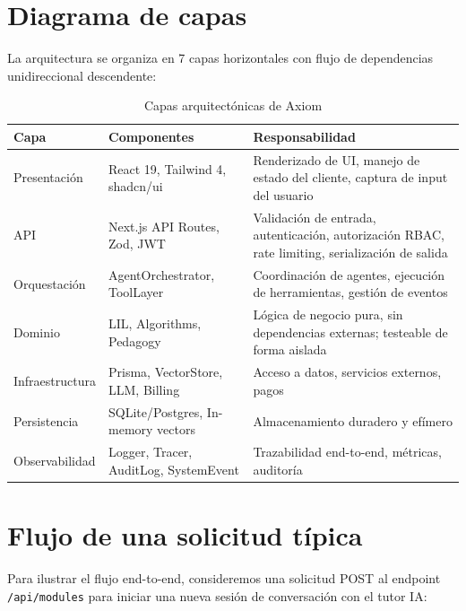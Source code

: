 \documentclass[10pt,a4paper,oneside]{report}
\begin{document}
\section{Diagrama de capas}
La arquitectura se organiza en 7 capas horizontales con flujo de dependencias unidireccional descendente:

\begin{table}[H]
\centering
\begin{tabular}{p{2.8cm}p{3.5cm}p{7.5cm}}
\toprule
\textbf{Capa} & \textbf{Componentes} & \textbf{Responsabilidad} \\
\midrule
Presentación & React 19, Tailwind 4, shadcn/ui & Renderizado de UI, manejo de estado del cliente, captura de input del usuario \\
API & Next.js API Routes, Zod, JWT & Validación de entrada, autenticación, autorización RBAC, rate limiting, serialización de salida \\
Orquestación & AgentOrchestrator, ToolLayer & Coordinación de agentes, ejecución de herramientas, gestión de eventos \\
Dominio & LIL, Algorithms, Pedagogy & Lógica de negocio pura, sin dependencias externas; testeable de forma aislada \\
Infraestructura & Prisma, VectorStore, LLM, Billing & Acceso a datos, servicios externos, pagos \\
Persistencia & SQLite/Postgres, In-memory vectors & Almacenamiento duradero y efímero \\
Observabilidad & Logger, Tracer, AuditLog, SystemEvent & Trazabilidad end-to-end, métricas, auditoría \\
\bottomrule
\end{tabular}
\caption{Capas arquitectónicas de Axiom}
\end{table}

\section{Flujo de una solicitud típica}
Para ilustrar el flujo end-to-end, consideremos una solicitud POST al endpoint \texttt{/api/modules} para iniciar una nueva sesión de conversación con el tutor IA:
\end{document}
